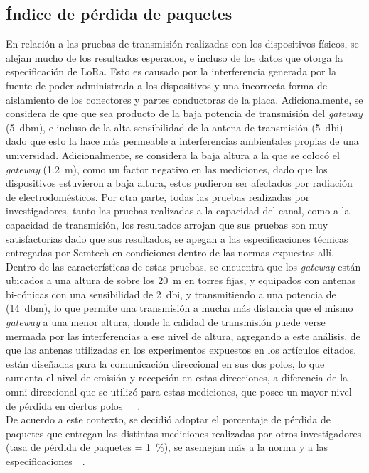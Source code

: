 \begin{justify}
\subsection{Índice de pérdida de paquetes}
En relación a las pruebas de transmisión realizadas con los dispositivos físicos, se alejan mucho de los resultados esperados, e incluso de los datos que otorga la especificación de LoRa. Esto es causado por la interferencia generada por la fuente de poder administrada a los dispositivos y una incorrecta forma de aislamiento de los conectores y partes conductoras de la placa. Adicionalmente, se considera de que que sea producto de la baja potencia de transmisión del \textit{gateway} (\SI{5}{dbm}), e incluso de la alta sensibilidad de la antena de transmisión (\SI{5}{dbi}) dado que esto la hace más permeable a interferencias ambientales propias de una universidad. Adicionalmente, se considera la baja altura a la que se colocó el \textit{gateway} (\SI{1.2}{\meter}), como un factor negativo en las mediciones, dado que los dispositivos estuvieron a baja altura, estos pudieron ser afectados por radiación de electrodomésticos. Por otra parte, todas las pruebas realizadas por investigadores, tanto las pruebas realizadas a la capacidad del canal, como a la capacidad de transmisión, los resultados arrojan que sus pruebas son muy satisfactorias dado que sus resultados, se apegan a las especificaciones técnicas entregadas por Semtech en condiciones dentro de las normas expuestas allí.\noindent 
Dentro de las características de estas pruebas, se encuentra que los \textit{gateway} están ubicados a una altura de sobre los \SI{20}{\meter} en torres fijas, y equipados con antenas bi-cónicas con una sensibilidad de \SI{2}{dbi}, y transmitiendo a una potencia de (\SI{14}{dbm}), lo que permite una transmisión a mucha más distancia que el mismo \textit{gateway} a una menor altura, donde la calidad de transmisión puede verse mermada por las interferencias a ese nivel de altura, agregando a este análisis, de que las antenas utilizadas en los experimentos expuestos en los artículos citados, están diseñadas para la comunicación direccional en sus dos polos, lo que aumenta el nivel de emisión y recepción en estas direcciones, a diferencia de la omni direccional que se utilizó para estas mediciones, que posee un mayor nivel de pérdida en ciertos polos~\cite{Xavier}~\cite{Juha}~\cite{NORMAN}.\\
De acuerdo a este contexto, se decidió adoptar el porcentaje de pérdida de paquetes que entregan las distintas mediciones realizadas por otros investigadores (tasa de pérdida de paquetes = \SI{1}{\percent}), se asemejan más a la norma y a las especificaciones~\cite{Xavier}~\cite{Juha}.


\end{justify}
